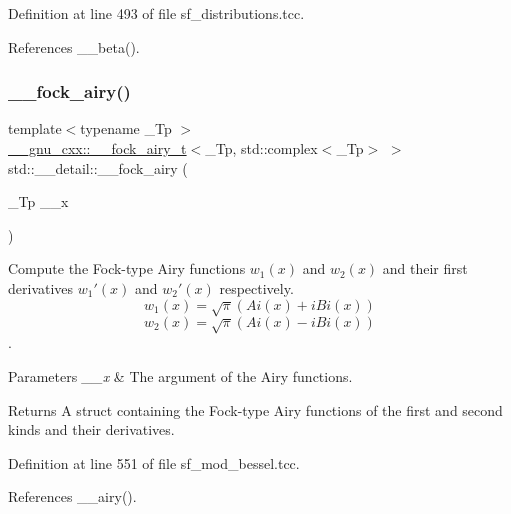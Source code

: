 Definition at line 493 of file sf\+\_\+distributions.\+tcc.



References \+\_\+\+\_\+beta().

\mbox{\label{namespacestd_1_1____detail_a482936d128727bf73a5953639fd3a7e0}} 
\subsubsection{\texorpdfstring{\+\_\+\+\_\+fock\+\_\+airy()}{\_\_fock\_airy()}}
{\footnotesize\ttfamily template$<$typename \+\_\+\+Tp $>$ \\
\hyperlink{struct____gnu__cxx_1_1____fock__airy__t}{\+\_\+\+\_\+gnu\+\_\+cxx\+::\+\_\+\+\_\+fock\+\_\+airy\+\_\+t}$<$\+\_\+\+Tp, std\+::complex$<$\+\_\+\+Tp$>$ $>$ std\+::\+\_\+\+\_\+detail\+::\+\_\+\+\_\+fock\+\_\+airy (\begin{DoxyParamCaption}\item[{\+\_\+\+Tp}]{\+\_\+\+\_\+x }\end{DoxyParamCaption})}



Compute the Fock-\/type Airy functions $ w_1(x) $ and $ w_2(x) $ and their first derivatives $ w_1'(x) $ and $ w_2'(x) $ respectively. \[ w_1(x) = \sqrt{\pi}(Ai(x) + iBi(x)) \] \[ w_2(x) = \sqrt{\pi}(Ai(x) - iBi(x)) \]. 


\begin{DoxyParams}{Parameters}
{\em \+\_\+\+\_\+x} & The argument of the Airy functions. \\
\hline
\end{DoxyParams}
\begin{DoxyReturn}{Returns}
A struct containing the Fock-\/type Airy functions of the first and second kinds and their derivatives. 
\end{DoxyReturn}


Definition at line 551 of file sf\+\_\+mod\+\_\+bessel.\+tcc.



References \+\_\+\+\_\+airy().

\mbox{\label{namespacestd_1_1____detail_a322045015cfbde5a45e7718d533de60d}} 
